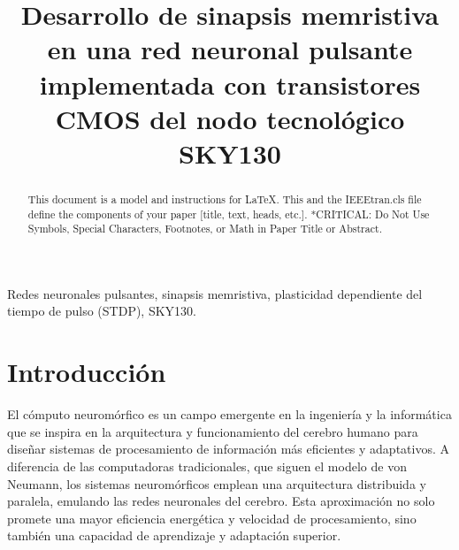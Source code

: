 \documentclass[conference]{IEEEtran}
\begin{document}
\title{Desarrollo de sinapsis memristiva en una red neuronal pulsante implementada con transistores CMOS del nodo tecnológico SKY130\\
}

\author{
\and
{}
\and
{}
}

\maketitle

\begin{abstract}
This document is a model and instructions for \LaTeX.
This and the IEEEtran.cls file define the components of your paper [title, text, heads, etc.]. *CRITICAL: Do Not Use Symbols, Special Characters, Footnotes, 
or Math in Paper Title or Abstract.
\end{abstract}

\begin{IEEEkeywords}
Redes neuronales pulsantes, sinapsis memristiva, plasticidad dependiente del tiempo de pulso (STDP), SKY130.
\end{IEEEkeywords}

\section{Introducción}
El cómputo neuromórfico es un campo emergente en la ingeniería y la informática que se inspira en la arquitectura y funcionamiento del cerebro humano para diseñar sistemas de procesamiento de información más eficientes y adaptativos. A diferencia de las computadoras tradicionales, que siguen el modelo de von Neumann, los sistemas neuromórficos emplean una arquitectura distribuida y paralela, emulando las redes neuronales del cerebro. Esta aproximación no solo promete una mayor eficiencia energética y velocidad de procesamiento, sino también una capacidad de aprendizaje y adaptación superior.
\end{document}
